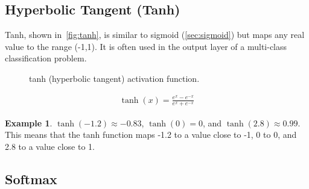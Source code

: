 \documentclass[oneside,11pt,dvipsnames]{book}
\numberwithin{equation}{section}
\theoremstyle{definition}
\newtheorem{example}{Example}[section]
\theoremstyle{remark}
\begin{document}
\subsection{Hyperbolic Tangent (Tanh)}\label{sec:tanh}

Tanh, shown in~\autoref{fig:tanh}, is similar to sigmoid (\autoref{sec:sigmoid})  but maps any real value to the range (-1,1). It is often used in the output layer of a multi-class classification problem.

\begin{figure}[htp]
    \centering
    \caption{tanh (hyperbolic tangent) activation function.}\label{fig:tanh}
\end{figure}

\begin{align}
\tanh(x) = \frac{e^x-e^{-x}}{e^x+e^{-x}}
\end{align}

\begin{example}
$\tanh(-1.2) \approx -0.83$, $\tanh(0) = 0$, and $\tanh(2.8) \approx 0.99$. This means that the tanh function maps -1.2 to a value close to -1, 0 to 0, and 2.8 to a value close to 1.
\end{example}

\subsection{Softmax}\label{sec:softmax}
\end{document}
